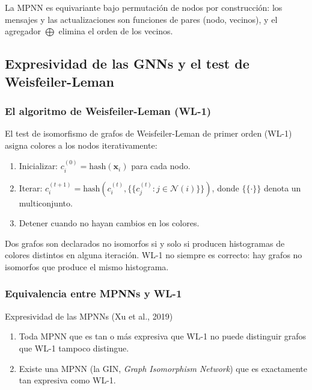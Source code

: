 La MPNN es equivariante bajo permutación de nodos por construcción: los mensajes
y las actualizaciones son funciones de pares (nodo, vecinos), y el agregador
$\bigoplus$ elimina el orden de los vecinos.

\subsection{Expresividad de las GNNs y el test de Weisfeiler-Leman}
\label{subsec:wl}

\subsubsection*{El algoritmo de Weisfeiler-Leman (WL-1)}

El test de isomorfismo de grafos de Weisfeiler-Leman de primer orden (WL-1)
asigna colores a los nodos iterativamente:
\begin{enumerate}
  \item Inicializar: $c_i^{(0)} = \mathrm{hash}(\bm{x}_i)$ para cada nodo.
  \item Iterar: $c_i^{(t+1)} = \mathrm{hash}\!\left(c_i^{(t)},
        \{\!\{ c_j^{(t)} : j \in \mathcal{N}(i) \}\!\}\right)$,
        donde $\{\!\{\cdot\}\!\}$ denota un multiconjunto.
  \item Detener cuando no hayan cambios en los colores.
\end{enumerate}
Dos grafos son declarados no isomorfos si y solo si producen histogramas de
colores distintos en alguna iteración. WL-1 no siempre es correcto: hay grafos
no isomorfos que produce el mismo histograma.

\subsubsection*{Equivalencia entre MPNNs y WL-1}

\begin{teorema}{Expresividad de las MPNNs (Xu et al., 2019)}
\label{thm:gnn_wl}
\begin{enumerate}
  \item Toda MPNN que es tan o más expresiva que WL-1 no puede distinguir
        grafos que WL-1 tampoco distingue.
  \item Existe una MPNN (la GIN, \textit{Graph Isomorphism Network}) que
        es exactamente tan expresiva como WL-1.
\end{enumerate}
\end{teorema}

